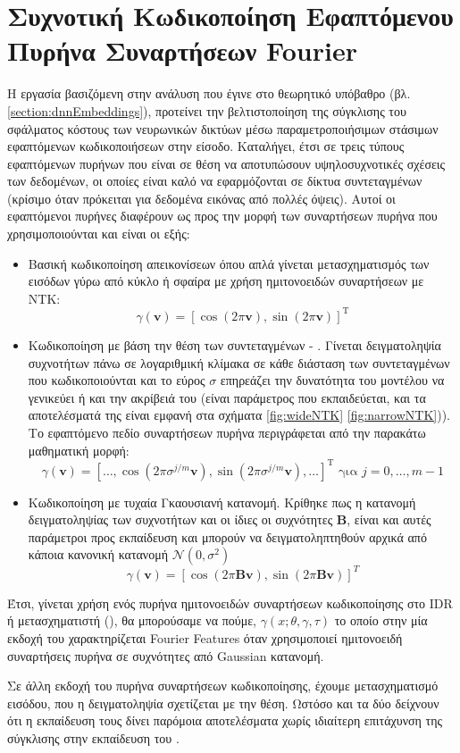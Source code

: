 \section{Συχνοτική Κωδικοποίηση Εφαπτόμενου Πυρήνα Συναρτήσεων Fourier}
\label{section4:FourierFeatureNets}
Η εργασία βασιζόμενη στην ανάλυση που έγινε στο θεωρητικό υπόβαθρο (βλ. \ref{section:dnnEmbeddings}), προτείνει την βελτιστοποίηση της σύγκλισης του σφάλματος κόστους των νευρωνικών δικτύων μέσω παραμετροποιήσιμων στάσιμων εφαπτόμενων κωδικοποιήσεων στην είσοδο. Καταλήγει, έτσι σε τρεις τύπους εφαπτόμενων πυρήνων που είναι σε θέση να αποτυπώσουν υψηλοσυχνοτικές σχέσεις των δεδομένων, οι οποίες είναι καλό να εφαρμόζονται σε δίκτυα συντεταγμένων (κρίσιμο όταν πρόκειται για δεδομένα εικόνας από πολλές όψεις). Αυτοί οι εφαπτόμενοι πυρήνες  διαφέρουν ως προς την μορφή των συναρτήσεων πυρήνα που χρησιμοποιούνται και είναι οι εξής:

\begin{itemize}
    \item Βασική κωδικοποίηση απεικονίσεων όπου απλά γίνεται μετασχηματισμός των εισόδων γύρω από κύκλο ή σφαίρα με χρήση ημιτονοειδών συναρτήσεων με NTK:
        \[ \gamma(\mathbf{v})=\left[\cos(2\pi\mathbf{v}), \sin(2\pi\mathbf{v})\right]^{\mathrm{T}}\]
    \item Κωδικοποίηση με βάση την θέση των συντεταγμένων - . Γίνεται δειγματοληψία συχνοτήτων πάνω σε λογαριθμική κλίμακα σε κάθε διάσταση των συντεταγμένων που κωδικοποιούνται και το εύρος $\sigma$ επηρεάζει την δυνατότητα του μοντέλου να γενικεύει ή και την ακρίβειά του (είναι παράμετρος που εκπαιδεύεται, και τα αποτελέσματά της είναι εμφανή στα σχήματα \ref{fig:wideNTK} \ref{fig:narrowNTK})). Το εφαπτόμενο πεδίο συναρτήσεων πυρήνα περιγράφεται από την παρακάτω μαθηματική μορφή:
    \[
    \gamma(\mathbf{v})=\left[\ldots, \cos \left(2 \pi \sigma^{j / m} \mathbf{v}\right), \sin \left(2 \pi \sigma^{j / m} \mathbf{v}\right), \ldots\right]^{\mathrm{T}} \text { για } j=0, \ldots, m-1
    \]
    \item Κωδικοποίηση με τυχαία Γκαουσιανή κατανομή. Κρίθηκε πως η κατανομή δειγματοληψίας των συχνοτήτων και οι ίδιες οι συχνότητες $\mathbf{B}$,  είναι και αυτές παράμετροι προς εκπαίδευση και μπορούν να δειγματοληπτηθούν αρχικά από κάποια κανονική κατανομή $\mathcal{N}(0, \sigma^2)$ 
    \[
    \gamma(\mathbf{v})=[\cos (2 \pi \mathbf{B} \mathbf{v}), \sin (2 \pi \mathbf{B} \mathbf{v})]^{T}
    \]
\end{itemize}
\par 
    Έτσι, γίνεται χρήση ενός πυρήνα ημιτονοειδών συναρτήσεων κωδικοποίησης στο IDR ή μετασχηματιστή (), θα μπορούσαμε να πούμε, $\gamma(x;\theta, \gamma, \tau)$ το οποίο στην μία εκδοχή του χαρακτηρίζεται Fourier Features όταν χρησιμοποιεί ημιτονοειδή συναρτήσεις πυρήνα σε συχνότητες από Gaussian κατανομή.

    Σε άλλη εκδοχή του πυρήνα συναρτήσεων κωδικοποίησης, έχουμε  μετασχηματισμό εισόδου, που η δειγματοληψία σχετίζεται με την θέση. Ωστόσο και τα δύο δείχνουν ότι η εκπαίδευση τους δίνει παρόμοια αποτελέσματα χωρίς ιδιαίτερη επιτάχυνση της σύγκλισης στην εκπαίδευση του .
    \clearpage